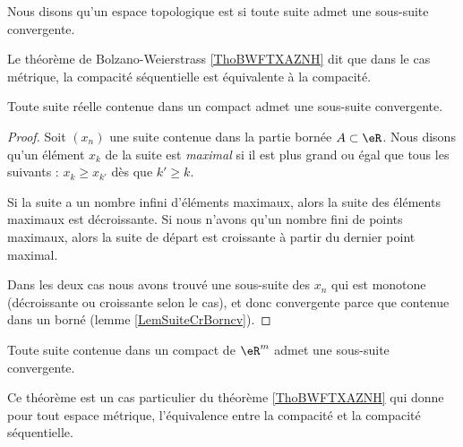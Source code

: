 \begin{definition}
    Nous disons qu'un espace topologique est  si toute suite admet une sous-suite convergente.
\end{definition}
Le théorème de Bolzano-Weierstrass \ref{ThoBWFTXAZNH} dit que dans le cas métrique, la compacité séquentielle est équivalente à la compacité.

\begin{theorem}
	Toute suite réelle contenue dans un compact admet une sous-suite convergente.
\end{theorem}

\begin{proof}
	Soit $(x_n)$ une suite contenue dans la partie bornée $A\subset\eR$. Nous disons qu'un élément $x_k$ de la suite est \emph{maximal} si il est plus grand ou égal que tous les suivants : $x_k\geq x_{k'}$ dès que $k'\geq k$.

	Si la suite a un nombre infini d'éléments maximaux, alors la suite des éléments maximaux est décroissante. Si nous n'avons qu'un nombre fini de points maximaux, alors la suite de départ est croissante à partir du dernier point maximal.

	Dans les deux cas nous avons trouvé une sous-suite des $x_n$ qui est monotone (décroissante ou croissante selon le cas), et donc convergente parce que contenue dans un borné (lemme \ref{LemSuiteCrBorncv}).
\end{proof}


\begin{theorem}		\label{ThoBolzanoWeierstrassRn}%
	Toute suite contenue dans un compact de \( \eR^m\) admet une sous-suite convergente.
\end{theorem}
Ce théorème est un cas particulier du théorème \ref{ThoBWFTXAZNH} qui donne pour tout espace métrique, l'équivalence entre la compacité et la compacité séquentielle.

